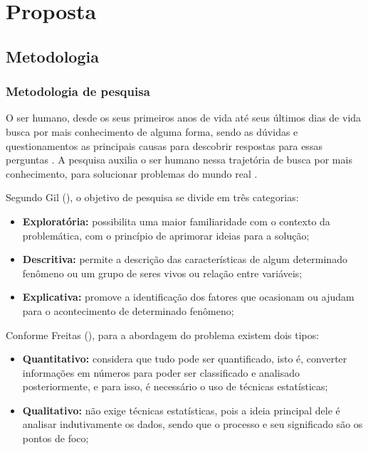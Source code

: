 \chapter{Proposta}

\section{Metodologia}

\subsection{Metodologia de pesquisa}

O ser humano, desde os seus primeiros anos de vida até seus últimos dias de vida busca por mais conhecimento de alguma forma, sendo as dúvidas e questionamentos as principais causas para descobrir respostas para essas perguntas \cite{Paschoarelli_Medola_Bonfim_2018}. A pesquisa auxilia o ser humano nessa trajetória de busca por mais conhecimento, para solucionar problemas do mundo real \cite{gil:2008}.

Segundo Gil (\citeyear{gil:2002}), o objetivo de pesquisa se divide em três categorias:

\begin{itemize}
    \item \textbf{Exploratória:} possibilita uma maior familiaridade com o contexto da problemática, com o princípio de aprimorar ideias para a solução;
    
    \item \textbf{Descritiva:} permite a descrição das características de algum determinado fenômeno ou um grupo 
    de seres vivos ou relação entre variáveis;
    
    \item \textbf{Explicativa:} promove a identificação dos fatores que ocasionam ou ajudam para o acontecimento de determinado fenômeno;

\end{itemize}

Conforme Freitas (\citeyear{de2013metodologia}), para a abordagem do problema existem dois tipos:

\begin{itemize}
    \item \textbf{Quantitativo:} considera que tudo pode ser quantificado, isto é, converter informações em números para poder ser classificado e analisado posteriormente, e para isso, é necessário o uso de técnicas estatísticas;
    
    \item \textbf{Qualitativo:} não exige técnicas estatísticas, pois a ideia principal dele é analisar indutivamente os dados, sendo que o processo e seu significado são os pontos de foco;
\end{itemize}



